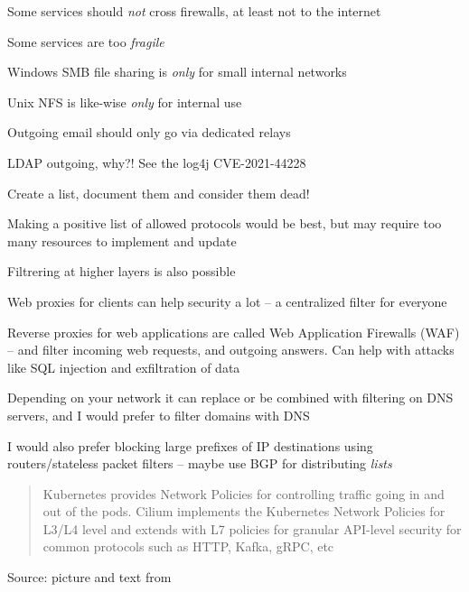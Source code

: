 \documentclass[Screen16to9,17pt]{foils}
\begin{document}

\begin{list1}
\item Some services should \emph{not} cross firewalls, at least not to the internet
\item Some services are too \emph{fragile}

\begin{list2}
\item Windows SMB file sharing is \emph{only} for small internal networks
\item Unix NFS is like-wise \emph{only} for internal use
\item Outgoing email should only go via dedicated relays
\item LDAP outgoing, why?! See the log4j CVE-2021-44228
\item Create a list, document them and consider them dead!
\end{list2}
\item Making a positive list of allowed protocols would be best, but may require too many resources to implement and update
\end{list1}



\begin{list2}
\item Filtrering at higher layers is also possible
\item Web proxies for clients can help security a lot -- a centralized filter for everyone

\item Reverse proxies for web applications are called
Web Application Firewalls (WAF) -- and filter incoming web requests, and outgoing answers. Can help with attacks like SQL injection and exfiltration of data
\item Depending on your network it can replace or be combined with filtering on DNS servers, and I would prefer to filter domains with DNS
\item I would also prefer blocking large prefixes of IP destinations using routers/stateless packet filters -- maybe use BGP for distributing \emph{lists}
\end{list2}




\begin{quote}
Kubernetes provides Network Policies for controlling traffic going in and out of the pods. Cilium implements the Kubernetes Network Policies for L3/L4 level and extends with L7 policies for granular API-level security for common protocols such as HTTP, Kafka, gRPC, etc
\end{quote}
Source: picture and text from 
\end{document}
